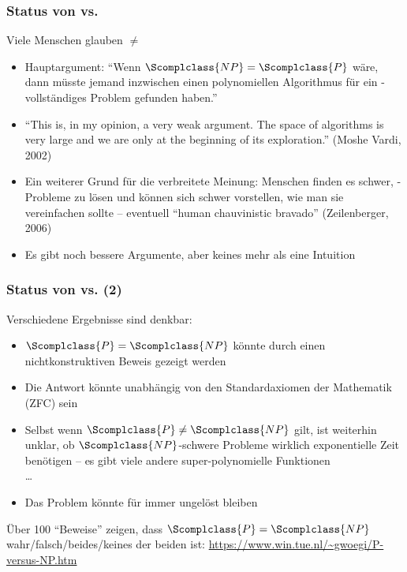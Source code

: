 \documentclass[aspectratio=1610,onlymath]{beamer}
\begin{document}
\begin{frame}\frametitle{Status von  vs. }

  Viele Menschen glauben  ${}\neq{}$ 
	\begin{itemize}
	\item Hauptargument: "`Wenn $\Scomplclass{NP} = \Scomplclass{P}$ wäre, dann müsste jemand inzwischen einen polynomiellen Algorithmus für ein -vollständiges Problem gefunden haben."'
	\item ``This is, in my opinion, a very weak argument. The space of algorithms is very large and we are only at the beginning of its exploration.'' (Moshe Vardi, 2002)
	\item Ein weiterer Grund für die verbreitete Meinung: Menschen finden es schwer, -Probleme zu lösen und können sich schwer vorstellen, wie man sie vereinfachen sollte
	-- eventuell ``human chauvinistic bravado'' (Zeilenberger, 2006)
	\item Es gibt noch bessere Argumente, aber keines mehr als eine Intuition
	\end{itemize}
\end{frame}

\begin{frame}\frametitle{Status von  vs.  (2)}

  Verschiedene Ergebnisse sind denkbar:\pause
  \begin{itemize}
	\item $\Scomplclass{P} =  \Scomplclass{NP}$ könnte durch einen nichtkonstruktiven Beweis gezeigt werden\pause
	\item Die Antwort könnte unabhängig von den Standardaxiomen der Mathematik (ZFC) sein\pause
	\item Selbst wenn $\Scomplclass{P} \neq \Scomplclass{NP}$ gilt, ist weiterhin unklar, ob $\Scomplclass{NP}$-schwere Probleme wirklich exponentielle Zeit benötigen -- es gibt viele andere super-polynomielle Funktionen\\\ldots\pause
	\item Das Problem könnte für immer ungelöst bleiben\pause
  \end{itemize}\bigskip
  
  Über 100 "`Beweise"' zeigen, dass $\Scomplclass{P} = \Scomplclass{NP}$ wahr/falsch/beides/keines der beiden ist: \url{https://www.win.tue.nl/~gwoegi/P-versus-NP.htm}
   
\end{frame}
\end{document}
